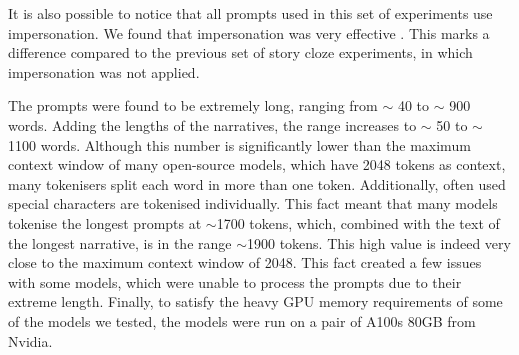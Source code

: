 It is also possible to notice that all prompts used in this set of experiments use impersonation. We found that impersonation was very effective \cite{impersonation}. This marks a difference compared to the previous set of story cloze experiments, in which impersonation was not applied.

The prompts were found to be extremely long, ranging from $\sim$ 40  to $\sim$ 900 words. Adding the lengths of the narratives, the range increases to  $\sim$ 50 to $\sim$ 1100 words. Although this number is significantly lower than the maximum context window of many open-source models, which have 2048 tokens as context, many tokenisers split each word in more than one token. Additionally, often used special characters are tokenised individually. This fact meant that many models tokenise the longest prompts at $\sim$1700 tokens, which, combined with the text of the longest narrative, is in the range $\sim$1900 tokens. This high value is indeed very close to the maximum context window of 2048. This fact created a few issues with some models, which were unable to process the prompts due to their extreme length. 
Finally, to satisfy the heavy GPU memory requirements of some of the models we tested, the models were run on a pair of A100s 80GB from Nvidia. 
